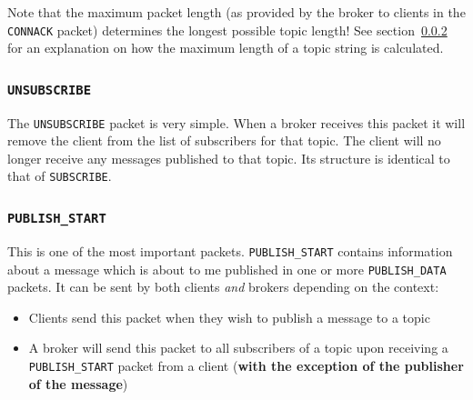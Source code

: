 \documentclass[a4paper]{article}
\numberwithin{figure}{section}
\numberwithin{table}{section}
\newcommand{\mi}{\mintinline}
\begin{document}
\medskip
Note that the maximum packet length (as provided by the broker to clients in the \mi{c}{CONNACK} packet) determines the longest possible topic length! See section~\ref{sec:pubstart} for an explanation on how the maximum length of a topic string is calculated.

\subsubsection{\mi{c}{UNSUBSCRIBE}}
The \mi{c}{UNSUBSCRIBE} packet is very simple. When a broker receives this packet it will remove the client from the list of subscribers for that topic. The client will no longer receive any messages published to that topic. Its structure is identical to that of \mi{c}{SUBSCRIBE}.

\subsubsection{\mi{c}{PUBLISH_START}} \label{sec:pubstart}
This is one of the most important packets. \mi{c}{PUBLISH_START} contains information about a message which is about to me published in one or more \mi{c}{PUBLISH_DATA} packets. It can be sent by both clients \textit{and} brokers depending on the context:
\begin{itemize}
	\item Clients send this packet when they wish to publish a message to a topic
	\item A broker will send this packet to all subscribers of a topic upon receiving a \mi{c}{PUBLISH_START} packet from a client (\textbf{with the exception of the publisher of the message})
\end{itemize}
\end{document}
